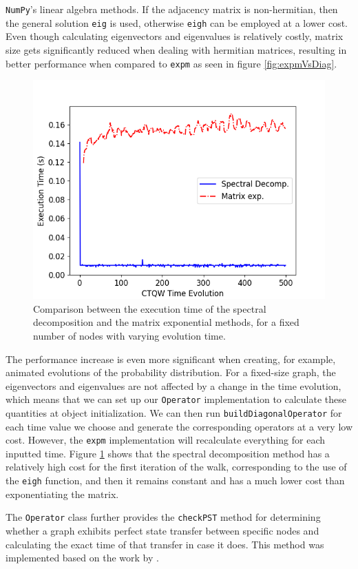 \documentclass[main.tex]{subfiles}
\begin{document}
\texttt{NumPy}'s linear algebra methods. If the adjacency matrix is
non-hermitian, then the general solution \texttt{eig} is used, otherwise
\texttt{eigh} can be employed at a lower cost. Even though calculating
eigenvectors and eigenvalues is relatively costly, matrix size gets
significantly reduced when dealing with hermitian matrices, resulting in better
performance when compared to \texttt{expm} as seen in figure
\ref{fig:expmVsDiag}.\par
\begin{figure}[!h]
	\centering
	\includegraphics[scale=0.50]{img/QWAK/expmVsDiagTime.png}
    \caption{Comparison between the execution time of the spectral decomposition and the matrix exponential methods, for a fixed number of nodes with varying evolution time.} 
	\label{fig:expmVsDiagTime}
\end{figure}
The performance increase is even more significant when creating, for example,
animated evolutions of the probability distribution. For a fixed-size graph,
the eigenvectors and eigenvalues are not affected by a change in the time
evolution, which means that we can set up our \texttt{Operator} implementation
to calculate these quantities at object initialization. We can then run
\texttt{buildDiagonalOperator} for each time value we choose and generate the
corresponding operators at a very low cost. However, the \texttt{expm} implementation
will recalculate everything for each inputted time.
Figure \ref{fig:expmVsDiagTime} shows that the spectral decomposition method
has a relatively high cost for the first iteration of the walk, corresponding
to the use of the \texttt{eigh} function, and then it remains constant and has a much
lower cost than exponentiating the matrix.\par
The \texttt{Operator} class further provides the \texttt{checkPST} method for
determining whether a graph exhibits perfect state transfer between specific 
nodes and calculating the exact time of that transfer in case it does. This
method was implemented based on the work by \cite{coutinho17}. 
\end{document}
